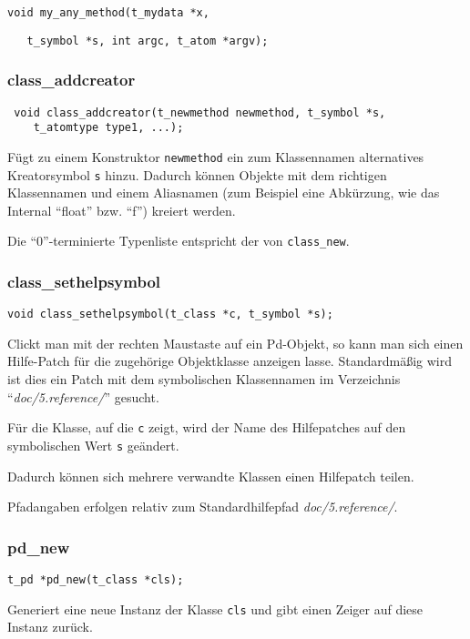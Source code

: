 \documentclass[12pt, a4paper,austrian, titlepage]{article}
\begin{document}
\begin{appendix}
\verb+void my_any_method(t_mydata *x,+

\verb+   t_symbol *s, int argc, t_atom *argv);+



\subsubsection{class\_addcreator}
\begin{verbatim}
 void class_addcreator(t_newmethod newmethod, t_symbol *s, 
    t_atomtype type1, ...);
\end{verbatim}
Fügt zu einem Konstruktor \verb+newmethod+ ein zum Klassennamen alternatives
Kreatorsymbol \verb+s+ hinzu.
Dadurch können Objekte mit dem richtigen Klassennamen und einem Aliasnamen
(zum Beispiel eine Abkürzung, wie das Internal ``float'' bzw. ``f'') kreiert werden.

Die ``0''-terminierte Typenliste entspricht der von \verb+class_new+.

\subsubsection{class\_sethelpsymbol}
\begin{verbatim}
void class_sethelpsymbol(t_class *c, t_symbol *s);
\end{verbatim}

Clickt man mit der rechten Maustaste auf ein Pd-Objekt,
so kann man sich einen Hilfe-Patch für die zugehörige Objektklasse anzeigen lasse.
Standardmäßig wird ist dies ein Patch mit dem symbolischen Klassennamen
im Verzeichnis ``{\em doc/5.reference/}'' gesucht.

Für die Klasse, auf die \verb+c+ zeigt, wird der Name des Hilfepatches auf den
symbolischen Wert \verb+s+ geändert.

Dadurch können sich mehrere verwandte Klassen einen Hilfepatch teilen.

Pfadangaben erfolgen relativ zum Standardhilfepfad {\em doc/5.reference/}.

\subsubsection{pd\_new}
\begin{verbatim}
t_pd *pd_new(t_class *cls);
\end{verbatim}
Generiert eine neue Instanz der Klasse \verb+cls+ und gibt einen Zeiger auf diese
Instanz zurück.


\end{appendix}
\end{document}
